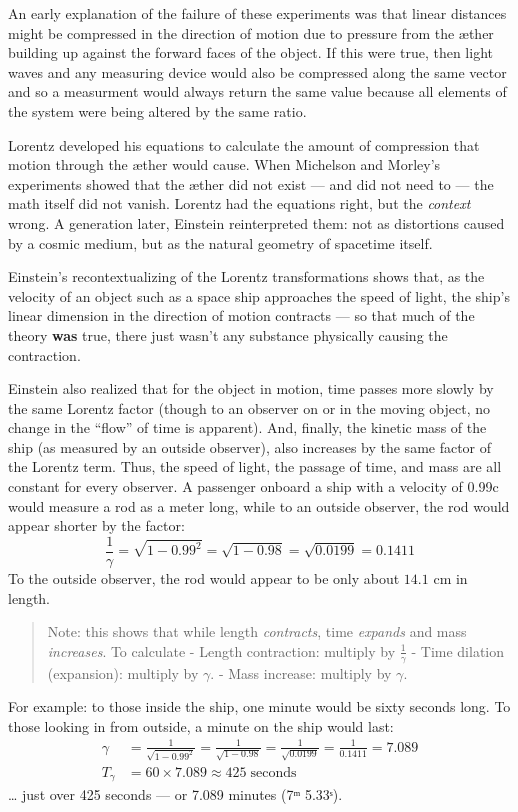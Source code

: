 \documentclass[
  letterpaper,
]{book}
\begin{document}
An early explanation of the failure of these experiments was that linear
distances might be compressed in the direction of motion due to pressure
from the æther building up against the forward faces of the object. If
this were true, then light waves and any measuring device would also be
compressed along the same vector and so a measurment would always return
the same value because all elements of the system were being altered by
the same ratio.

Lorentz developed his equations to calculate the amount of compression
that motion through the æther would cause. When Michelson and Morley's
experiments showed that the æther did not exist --- and did not need to
--- the math itself did not vanish. Lorentz had the equations right, but
the \emph{context} wrong. A generation later, Einstein reinterpreted
them: not as distortions caused by a cosmic medium, but as the natural
geometry of spacetime itself.

Einstein's recontextualizing of the Lorentz transformations shows that,
as the velocity of an object such as a space ship approaches the speed
of light, the ship's linear dimension in the direction of motion
contracts --- so that much of the theory \textbf{was} true, there just
wasn't any substance physically causing the contraction.

Einstein also realized that for the object in motion, time passes more
slowly by the same Lorentz factor (though to an observer on or in the
moving object, no change in the ``flow'' of time is apparent). And,
finally, the kinetic mass of the ship (as measured by an outside
observer), also increases by the same factor of the Lorentz term. Thus,
the speed of light, the passage of time, and mass are all constant for
every observer. A passenger onboard a ship with a velocity of 0.99c
would measure a rod as a meter long, while to an outside observer, the
rod would appear shorter by the factor: \[
\frac{1}{\gamma} = \sqrt{1 - 0.99^2} = \sqrt{1 - 0.98} = \sqrt{0.0199} = 0.1411
\] To the outside observer, the rod would appear to be only about
\(14.1\) cm in length.

\begin{quote}
Note: this shows that while length \emph{contracts}, time \emph{expands}
and mass \emph{increases}. To calculate - Length contraction: multiply
by \(\frac{1}{\gamma}\) - Time dilation (expansion): multiply by
\(\gamma\). - Mass increase: multiply by \(\gamma\).
\end{quote}

For example: to those inside the ship, one minute would be sixty seconds
long. To those looking in from outside, a minute on the ship would last:
\[
\begin{align}
\gamma &= \frac{1}{\sqrt{1 - 0.99^2}} = \frac{1}{\sqrt{1 - 0.98}} = \frac{1}{\sqrt{0.0199}} = \frac{1}{0.1411} = 7.089 \\[0.5em]
T_\gamma &= 60 \times 7.089 ≈ 425\;\text{seconds}
\end{align}
\] \ldots{} just over 425 seconds --- or 7.089 minutes (7ᵐ 5.33ˢ).
\end{document}
